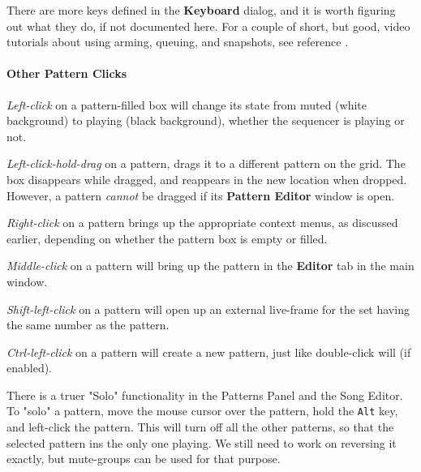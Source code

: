    There are more keys defined in the \textbf{Keyboard} dialog, and it is
   worth figuring out what they do, if not documented here.
   For a couple of short, but good, video tutorials about using arming,
   queuing, and snapshots, see reference \cite{wootangent1}.

\paragraph{Other Pattern Clicks}
\label{paragraph:patterns_pattern_clicks}

   \textsl{Left-click} on a pattern-filled box will change its state
   from muted (white background) to playing (black background), whether
   the sequencer is playing or not.

   \textsl{Left-click-hold-drag} on a pattern, drags it to a different
   pattern on the grid.
   The box disappears while dragged, and reappears in the new location when
   dropped.  However, a pattern \textsl{cannot} be dragged if its
   \textbf{Pattern Editor} window is open.

   \textsl{Right-click} on a pattern brings up the appropriate context menus, as
   discussed earlier, depending on whether the pattern box is empty or
   filled.

   \textsl{Middle-click} on a pattern will bring up the pattern
   in the \textbf{Editor}
   tab in the main window.

   \textsl{Shift-left-click} on a pattern will open up an external
   live-frame for the
   set having the same number as the pattern.

   \textsl{Ctrl-left-click} on a pattern will create a new pattern, just like
   double-click will (if enabled).

   There is a truer "Solo" functionality in the Patterns
   Panel and the Song Editor.  To "solo" a pattern, move the mouse cursor
   over the pattern, hold the \texttt{Alt} key, and left-click the pattern.
   This will turn off all the other patterns, so that the selected pattern ins
   the only one playing.
   We still need to work on reversing it exactly, but
   mute-groups can be used for that purpose.

